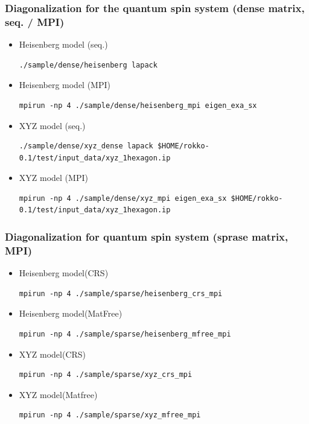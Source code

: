\begin{frame}[c,fragile]
  \frametitle{Diagonalization for the quantum spin system (dense matrix, seq. / MPI)}
  \begin{itemize}
  \item Heisenberg model (seq.) 
\begin{lstlisting}[style=shstyle]
./sample/dense/heisenberg lapack
\end{lstlisting}
  \item Heisenberg model (MPI) 
\begin{lstlisting}[style=shstyle]
mpirun -np 4 ./sample/dense/heisenberg_mpi eigen_exa_sx
\end{lstlisting}
  \item XYZ model (seq.) 
\begin{lstlisting}[style=shstyle]
./sample/dense/xyz_dense lapack $HOME/rokko-0.1/test/input_data/xyz_1hexagon.ip
\end{lstlisting}
  \item XYZ model (MPI) 
\begin{lstlisting}[style=shstyle]
mpirun -np 4 ./sample/dense/xyz_mpi eigen_exa_sx $HOME/rokko-0.1/test/input_data/xyz_1hexagon.ip
\end{lstlisting}
  \end{itemize}
\end{frame}

\begin{frame}[c,fragile]
  \frametitle{Diagonalization for quantum spin system (sprase matrix, MPI)}
  \begin{itemize}
  \item Heisenberg model(CRS) 
\begin{lstlisting}[style=shstyle]
mpirun -np 4 ./sample/sparse/heisenberg_crs_mpi
\end{lstlisting}
  \item Heisenberg model(MatFree) 
\begin{lstlisting}[style=shstyle]
mpirun -np 4 ./sample/sparse/heisenberg_mfree_mpi
\end{lstlisting}
  \item XYZ model(CRS) 
\begin{lstlisting}[style=shstyle]
mpirun -np 4 ./sample/sparse/xyz_crs_mpi
\end{lstlisting}
  \item XYZ model(Matfree) 
\begin{lstlisting}[style=shstyle]
mpirun -np 4 ./sample/sparse/xyz_mfree_mpi
\end{lstlisting}
  \end{itemize}
\end{frame}

